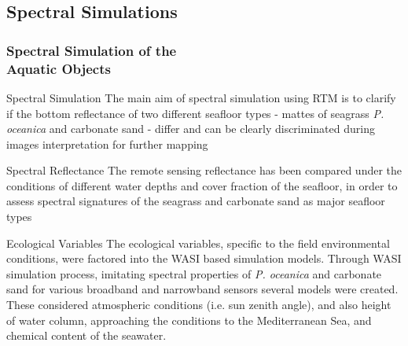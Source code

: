 \documentclass[pdflatex,compress,9pt,
	xcolor={dvipsnames,dvipsnames,svgnames,x11names,table},
	hyperref={colorlinks = true,breaklinks = true, urlcolor = NavyBlue, breaklinks = true}]{beamer}
\begin{document}
\subsection{Spectral Simulations}
\begin{frame}\frametitle{Spectral Simulation of the \\Aquatic Objects}

\small{
\begin{alertblock}{Spectral Simulation}
The main aim of spectral simulation using \ac{RTM} is to clarify if the bottom reflectance of two different seafloor types - mattes of seagrass \emph{P. oceanica} and carbonate sand - differ and can be clearly discriminated during images interpretation for further mapping
\end{alertblock}

\begin{block}{Spectral Reflectance}
The remote sensing reflectance has been compared under the conditions of different water depths and cover fraction of the seafloor, in order to assess spectral signatures of the seagrass and carbonate sand as major seafloor types
\end{block}

\begin{block}{Ecological Variables}
The ecological variables, specific to the field environmental conditions, were factored into the \ac{WASI} based simulation models. Through \ac{WASI} simulation process, imitating spectral properties of \emph{P. oceanica} and carbonate sand for various broadband and narrowband sensors several models were created. These considered atmospheric conditions (i.e. sun zenith angle), and also height of water column, approaching the conditions to the Mediterranean Sea, and chemical content of the seawater.
\end{block}
}

\end{frame}
\end{document}
